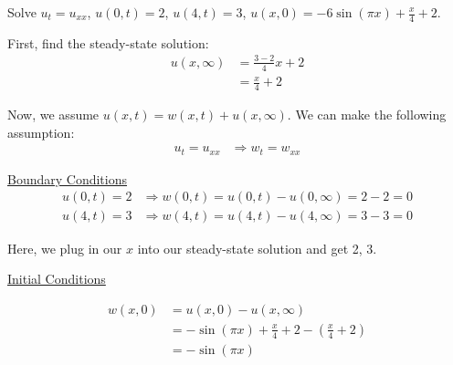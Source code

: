 \documentclass{article}
\begin{document}
Solve $u_t = u_{xx}$, $u(0, t) = 2$, $u(4, t) = 3$, $u(x, 0) = -6 \sin(\pi x) + \frac{x}{4} + 2$.

First, find the steady-state solution:
%
\begin{align}
  u(x, \infty) & = \frac{3 - 2}{4} x + 2\\
  & = \frac{x}{4} + 2
\end{align}

Now, we assume $u(x, t) = w(x, t) + u(x, \infty)$. We can make the following assumption:
%
\begin{align}
  u_t = u_{xx} & \Rightarrow w_t = w_{xx}
\end{align}

\underline{Boundary Conditions}
\begin{align}
  u(0, t) = 2 & \Rightarrow w(0, t) = u(0, t) - u(0, \infty) = 2 - 2 = 0\\
  u(4, t) = 3 & \Rightarrow w(4, t) = u(4, t) - u(4, \infty) = 3 - 3 = 0
\end{align}

Here, we plug in our $x$ into our steady-state solution and get 2, 3.

\underline{Initial Conditions}

\begin{align}
  w(x, 0) & = u(x, 0) - u(x, \infty)\\
  & = -\sin(\pi x) + \frac{x}{4} + 2 - \left(\frac{x}{4} + 2\right)\\
  & = -\sin(\pi x)
\end{align}
\end{document}

